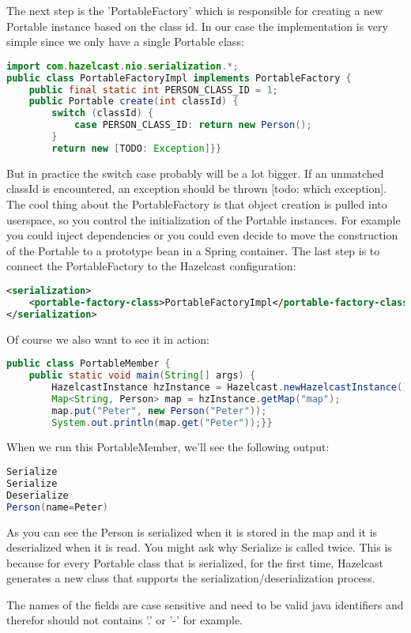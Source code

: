 The next step is the 'PortableFactory' which is responsible for creating a new Portable instance based on the class id. In our case the implementation is very simple since we only have a single Portable class:
\begin{lstlisting}[language=java]
import com.hazelcast.nio.serialization.*;
public class PortableFactoryImpl implements PortableFactory {
    public final static int PERSON_CLASS_ID = 1;
    public Portable create(int classId) {
        switch (classId) {
            case PERSON_CLASS_ID: return new Person();
        }
        return new [TODO: Exception]}}
\end{lstlisting}
But in practice the switch case probably will be a lot bigger. If an unmatched classId is encountered, an exception should be thrown [todo: which exception]. The cool thing about the PortableFactory is that object creation is pulled into userspace, so you control the initialization of the Portable instances. For example you could inject dependencies or you could even decide to move the construction of the Portable to a prototype bean in a Spring container. The last step is to connect the PortableFactory to the Hazelcast configuration:
\begin{lstlisting}[language=xml]
<serialization>
    <portable-factory-class>PortableFactoryImpl</portable-factory-class>
</serialization>
\end{lstlisting}
Of course we also want to see it in action:
\begin{lstlisting}[language=java]
public class PortableMember {
    public static void main(String[] args) {
        HazelcastInstance hzInstance = Hazelcast.newHazelcastInstance();
        Map<String, Person> map = hzInstance.getMap("map");
        map.put("Peter", new Person("Peter"));
        System.out.println(map.get("Peter"));}}
\end{lstlisting}
When we run this PortableMember, we'll see the following output:
\begin{lstlisting}[language=java]
Serialize
Serialize
Deserialize
Person(name=Peter)
\end{lstlisting}
As you can see the Person is serialized when it is stored in the map and it is deserialized when it is read. You might ask why Serialize is called twice. This is because for every Portable class that is serialized, for the first time, Hazelcast generates a new class that supports the serialization/deserialization process. 

The names of the fields are case sensitive and need to be valid java identifiers and therefor should not contains '.' or '-' for example. 

